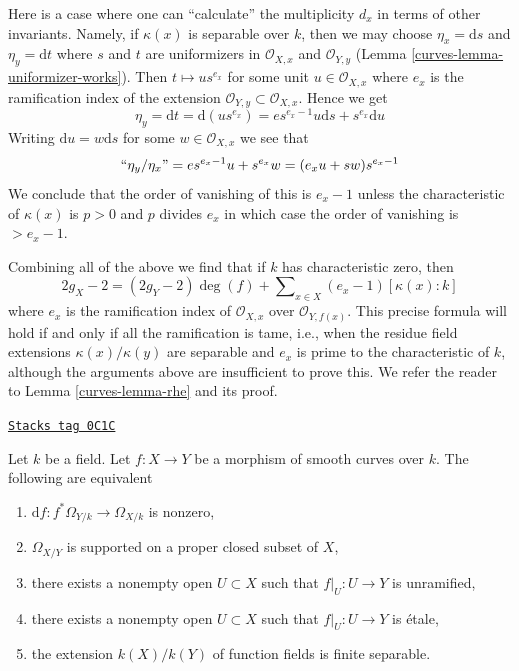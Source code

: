\medskip\noindent
Here is a case where one can ``calculate'' the multiplicity $d_x$ in terms
of other invariants. Namely, if $\kappa(x)$ is separable over $k$, then
we may choose $\eta_x = \text{d}s$ and $\eta_y = \text{d}t$ where $s$
and $t$ are uniformizers in $\mathcal{O}_{X, x}$ and $\mathcal{O}_{Y, y}$
(Lemma \ref{curves-lemma-uniformizer-works}).
Then $t \mapsto u s^{e_x}$ for some unit $u \in \mathcal{O}_{X, x}$
where $e_x$ is the ramification index of the extension
$\mathcal{O}_{Y, y} \subset \mathcal{O}_{X, x}$. Hence we get
$$
\eta_y = \text{d}t = \text{d}(u s^{e_x}) =
e s^{e_x - 1} u \text{d}s + s^{e_x} \text{d}u
$$
Writing $\text{d}u = w \text{d}s$ for some $w \in \mathcal{O}_{X, x}$
we see that
$$
``\eta_y/\eta_x" = e s^{e_x - 1} u + s^{e_x} w = (e_x u + s w)s^{e_x - 1}
$$
We conclude that the order of vanishing of this is $e_x - 1$
unless the characteristic of $\kappa(x)$ is $p > 0$ and $p$ divides $e_x$
in which case the order of vanishing is $> e_x - 1$.

\medskip\noindent
Combining all of the above we find that if $k$ has characteristic
zero, then
$$
2g_X - 2 = (2g_Y - 2)\deg(f) +
\sum\nolimits_{x \in X} (e_x - 1)[\kappa(x) : k]
$$
where $e_x$ is the ramification index of $\mathcal{O}_{X, x}$ over
$\mathcal{O}_{Y, f(x)}$. This precise formula will hold if and only
if all the ramification is tame, i.e., when the
residue field extensions $\kappa(x)/\kappa(y)$ are separable and
$e_x$ is prime to the characteristic of $k$, although the
arguments above are insufficient to prove this. We refer the reader
to Lemma \ref{curves-lemma-rhe} and its proof.

\begin{lemma}
\label{curves-lemma-generically-etale}
\href{https://stacks.math.columbia.edu/tag/0C1C}{\texttt{Stacks tag 0C1C}}


Let $k$ be a field. Let $f : X \to Y$ be a morphism of smooth curves over $k$.
The following are equivalent
\begin{enumerate}
\item $\text{d}f : f^*\Omega_{Y/k} \to \Omega_{X/k}$ is nonzero,
\item $\Omega_{X/Y}$ is supported on a proper closed subset of $X$,
\item there exists a nonempty open $U \subset X$ such that
$f|_U : U \to Y$ is unramified,
\item there exists a nonempty open $U \subset X$ such that
$f|_U : U \to Y$ is \'etale,
\item the extension $k(X)/k(Y)$ of function fields is
finite separable.
\end{enumerate}
\end{lemma}

